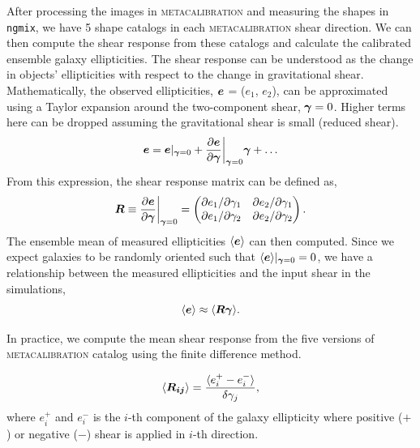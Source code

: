 \documentclass[fleqn,usenatbib]{mnras}
\begin{document}
After processing the images in \textsc{metacalibration} and measuring the shapes in \texttt{ngmix}, we have 5 shape catalogs in each \textsc{metacalibration} shear direction. We can then compute the shear response from these catalogs and calculate the calibrated ensemble galaxy ellipticities. The shear response can be understood as the change in objects' ellipticities with respect to the change in gravitational shear. Mathematically, the observed ellipticities, $\vb*{e}$ = ($e_{1}$, $e_{2}$), can be approximated using a Taylor expansion around the two-component shear, $\vb*{\gamma}=0$. Higher terms here can be dropped assuming the gravitational shear is small (reduced shear). 
\begin{equation}
    \vb*{e} = \vb*{e}\rvert_{\vb*{\gamma}=0} + \frac{\partial \vb*{e}}{\partial \vb*{\gamma}}\bigg\rvert_{\vb*{\gamma}=0}\vb*{\gamma} + \ldots
\end{equation}
From this expression, the shear response matrix can be defined as, 
\begin{equation}
    \vb*{R} \equiv \frac{\partial \vb*{e}}{\partial \vb*{\gamma}}\bigg\rvert_{\vb*{\gamma}=0} = 
    \begin{pmatrix}
        \partial e_{1}/\partial \gamma_{1} & \partial e_{2}/\partial \gamma_{1} \\ 
        \partial e_{1}/\partial \gamma_{2} & \partial e_{2}/\partial \gamma_{2}
    \end{pmatrix}. 
\end{equation}
The ensemble mean of measured ellipticities $\langle\vb*{e}\rangle$ can then computed. Since we expect galaxies to be randomly oriented such that $\langle\vb*{e}\rangle\rvert_{\vb*{\gamma}=0}=0$, we have a relationship between the measured ellipticities and the input shear in the simulations, 
\begin{equation}
    \langle\vb*{e}\rangle \approx \langle \vb*{R}\vb*{\gamma} \rangle. 
\end{equation} 


In practice, we compute the mean shear response from the five versions of \textsc{metacalibration} catalog using the finite difference method. 

\begin{equation}
    \langle\vb*{R_{ij}}\rangle = 
    \frac{\langle e^{+}_{i} - e^{-}_{i} \rangle}{\delta\gamma_{j}}, 
\end{equation}
where $e^{+}_{i}$ and $e^{-}_{i}$ is the $i$-th component of the galaxy ellipticity where positive ($+$) or negative ($-$) shear is applied in $i$-th direction. 
\end{document}
